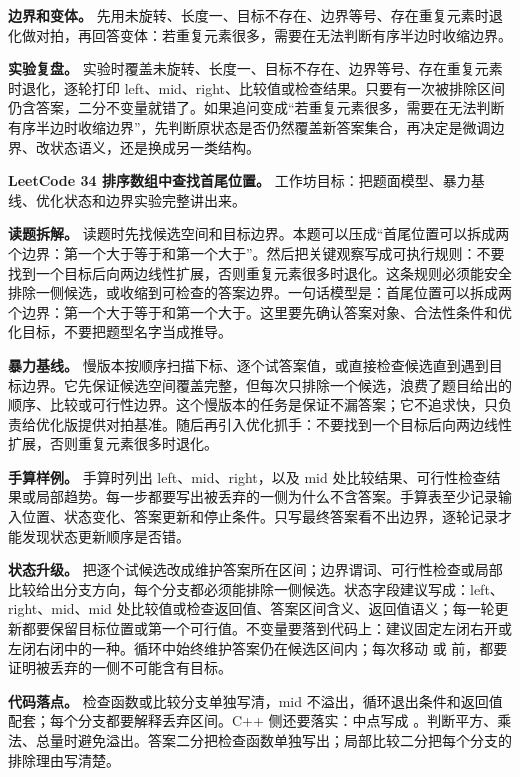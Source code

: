 \textbf{边界和变体。} 先用未旋转、长度一、目标不存在、边界等号、存在重复元素时退化做对拍，再回答变体：若重复元素很多，需要在无法判断有序半边时收缩边界。

\textbf{实验复盘。} 实验时覆盖未旋转、长度一、目标不存在、边界等号、存在重复元素时退化，逐轮打印 left、mid、right、比较值或检查结果。只要有一次被排除区间仍含答案，二分不变量就错了。如果追问变成“若重复元素很多，需要在无法判断有序半边时收缩边界”，先判断原状态是否仍然覆盖新答案集合，再决定是微调边界、改状态语义，还是换成另一类结构。

\noindent\textbf{LeetCode 34 排序数组中查找首尾位置。} 工作坊目标：把题面模型、暴力基线、优化状态和边界实验完整讲出来。

\textbf{读题拆解。} 读题时先找候选空间和目标边界。本题可以压成“首尾位置可以拆成两个边界：第一个大于等于和第一个大于”。然后把关键观察写成可执行规则：不要找到一个目标后向两边线性扩展，否则重复元素很多时退化。这条规则必须能安全排除一侧候选，或收缩到可检查的答案边界。一句话模型是：首尾位置可以拆成两个边界：第一个大于等于和第一个大于。这里要先确认答案对象、合法性条件和优化目标，不要把题型名字当成推导。

\textbf{暴力基线。} 慢版本按顺序扫描下标、逐个试答案值，或直接检查候选直到遇到目标边界。它先保证候选空间覆盖完整，但每次只排除一个候选，浪费了题目给出的顺序、比较或可行性边界。这个慢版本的任务是保证不漏答案；它不追求快，只负责给优化版提供对拍基准。随后再引入优化抓手：不要找到一个目标后向两边线性扩展，否则重复元素很多时退化。

\textbf{手算样例。} 手算时列出 left、mid、right，以及 mid 处比较结果、可行性检查结果或局部趋势。每一步都要写出被丢弃的一侧为什么不含答案。手算表至少记录输入位置、状态变化、答案更新和停止条件。只写最终答案看不出边界，逐轮记录才能发现状态更新顺序是否错。

\textbf{状态升级。} 把逐个试候选改成维护答案所在区间；边界谓词、可行性检查或局部比较给出分支方向，每个分支都必须能排除一侧候选。状态字段建议写成：left、right、mid、mid 处比较值或检查返回值、答案区间含义、返回值语义；每一轮更新都要保留目标位置或第一个可行值。不变量要落到代码上：建议固定左闭右开或左闭右闭中的一种。循环中始终维护答案仍在候选区间内；每次移动  或  前，都要证明被丢弃的一侧不可能含有目标。

\textbf{代码落点。} 检查函数或比较分支单独写清，mid 不溢出，循环退出条件和返回值配套；每个分支都要解释丢弃区间。C++ 侧还要落实：中点写成 。判断平方、乘法、总量时避免溢出。答案二分把检查函数单独写出；局部比较二分把每个分支的排除理由写清楚。

